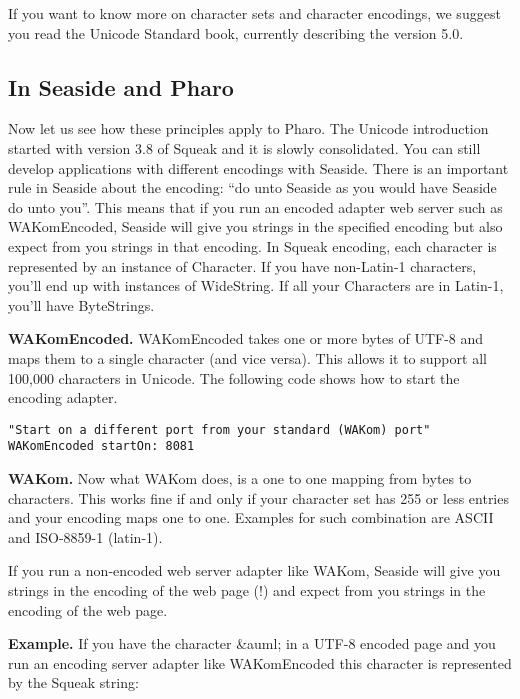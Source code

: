 \documentclass[a4paper,10pt,twoside]{book}
\newcommand{\ct}[1]{{\small\ttfamily\textup{#1}}}
\begin{document}
If you want to know more on character sets and character encodings, we suggest you read the Unicode Standard book, currently describing the version 5.0.

\subsection{In Seaside and Pharo}
\label{book:inaction:servingfiles:characterencodings:seasidepharo}

Now let us see how these principles apply to Pharo. The Unicode introduction started with version 3.8 of Squeak and it is slowly consolidated. You can still develop  applications with different encodings with Seaside. There is an important rule in Seaside about the encoding: ``do unto Seaside as you would have Seaside do unto you''. This means that if you run an encoded adapter web server such as \ct{WAKomEncoded}, Seaside will give you strings in the specified encoding but also expect from you strings in that encoding. In Squeak encoding, each character is represented by an instance of \ct{Character}. If you have non-Latin-1 characters, you'll end up with instances of \ct{WideString}. If all your Characters are in Latin-1, you'll have \ct{ByteStrings}.

\textbf{WAKomEncoded.} \ct{WAKomEncoded} takes one or more bytes of UTF-8 and maps them to a single character (and vice versa). This allows it to support all 100,000 characters in Unicode. The following code shows how to start the encoding adapter.

\begin{lstlisting}
"Start on a different port from your standard (WAKom) port"
WAKomEncoded startOn: 8081
\end{lstlisting}

\textbf{WAKom.} Now what \ct{WAKom} does, is a one to one mapping from bytes to characters. This works fine if and only if your character set has 255 or less entries and your encoding maps one to one. Examples for such combination are ASCII and ISO-8859-1 (latin-1).

If you run a non-encoded web server adapter like \ct{WAKom}, Seaside will give you strings in the encoding of the web page (!) and expect from you strings in the encoding of the web page.

\textbf{Example.} If you have the character \ct{\&auml;} in a UTF-8 encoded page and you run an encoding server adapter like \ct{WAKomEncoded} this character is represented by the Squeak string:
\end{document}
